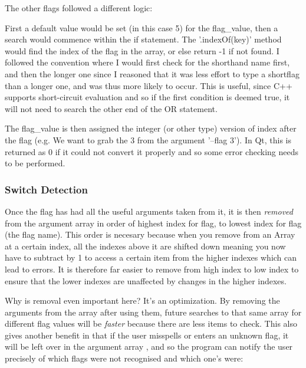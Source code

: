The other flags followed a different logic:
\begin{frame}{}
\vspace{-10pt}

\end{frame}
 First a default value would be set (in this case 5) for the flag\_value, then a search would commence within the if statement.  The '.indexOf(key)' method would find the index of the flag in the array, or else return -1 if not found. I followed the convention where I would first check for the shorthand name first, and then the longer one since I reasoned that it was less effort to type a shortflag than a longer one, and was thus more likely to occur. This is useful, since C++ supports short-circuit evaluation and so if the first condition is deemed true, it will not need to search the other end of the OR statement.

The flag\_value is then assigned the integer (or other type) version of index after the flag (e.g. We want to grab the 3 from the argument '--flag 3'). In Qt, this is returned as 0 if it could not convert it properly and so some error checking needs to be performed.

\subsubsection{Switch Detection}
Once the flag has had all the useful arguments taken from it, it is then {\it removed} from the argument array in order of highest index for flag, to lowest index for flag (the flag name). This order is necesary because when you remove from an Array at a certain index, all the indexes above it are shifted down meaning you now have to subtract by 1 to access a certain item from the higher indexes which can lead to errors. It is therefore far easier to remove from high index to low index to ensure that the lower indexes are unaffected by changes in the higher indexes.

Why is removal even important here? It's an optimization. By removing the arguments from the array after using them, future searches to that same array for different flag values will be {\it faster} because there are less items to check. This also gives another benefit in that if the user misspells or enters an unknown flag, it will be left over in the argument array , and so the program can notify the user precisely of which flags were not recognised and which one's were:
\begin{frame}{}

\end{frame}


